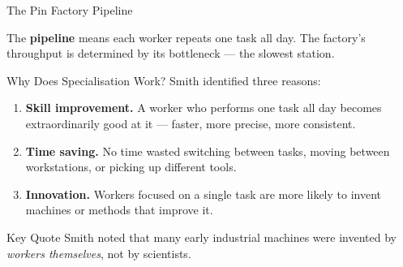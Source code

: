 \documentclass[aspectratio=169, 10pt]{beamer}
\begin{document}
\begin{frame}{The Pin Factory Pipeline}
\begin{center}
\end{center}
\vspace{0.5em}
The \textbf{pipeline} means each worker repeats one task all day.
The factory's throughput is determined by its \alert{bottleneck} ---
the slowest station.
\end{frame}

\begin{frame}{Why Does Specialisation Work?}
Smith identified three reasons:
\vspace{0.5em}
\begin{enumerate}
  \item \textbf{Skill improvement.}
        A worker who performs one task all day becomes extraordinarily
        good at it --- faster, more precise, more consistent.
  \item \textbf{Time saving.}
        No time wasted switching between tasks, moving between
        workstations, or picking up different tools.
  \item \textbf{Innovation.}
        Workers focused on a single task are more likely to invent
        machines or methods that improve it.
\end{enumerate}
\vspace{0.5em}
\begin{alertblock}{Key Quote}
Smith noted that many early industrial machines were invented by
\textit{workers themselves}, not by scientists.
\end{alertblock}
\end{frame}
\end{document}
